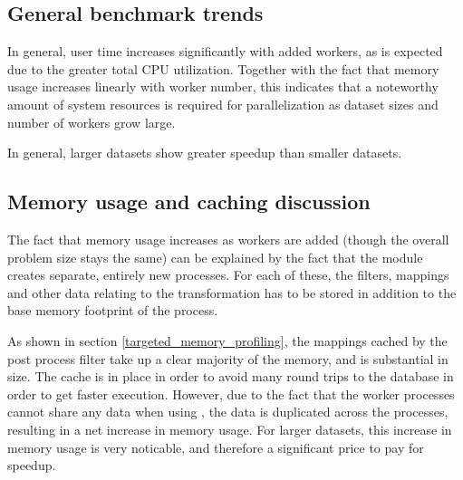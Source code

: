 
\subsection{General benchmark trends}
In general, user time increases significantly with added workers, as is expected due to the greater total CPU utilization. Together with the
fact that memory usage increases linearly with worker number, this indicates that a noteworthy amount of system resources is required 
for parallelization as dataset sizes and number of workers grow large.

In general, larger datasets show greater speedup than smaller datasets.

\subsection{Memory usage and caching discussion}
The fact that memory usage increases as workers are added (though the overall problem size stays the same)
can be explained by the fact that the  module creates separate, entirely
new processes. For each of these, the filters, mappings and other data relating to the transformation has to be stored in addition to the
base memory footprint of the process. 

As shown in section \ref{targeted_memory_profiling}, the mappings cached by the post process filter take up a clear majority of the memory,
and is substantial in size. The cache is in place in order to avoid many round trips to the database in order to get faster execution. However,
due to the fact that the worker processes cannot share any data when using , the data is duplicated across the processes,
resulting in a net increase in memory usage. For larger datasets, this increase in memory usage is very noticable, and therefore a
significant price to pay for speedup.

